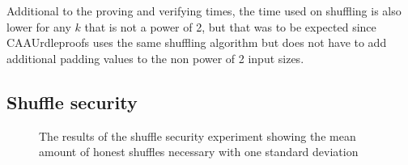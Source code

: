 Additional to the proving and verifying times, the time used on shuffling is also lower for any $k$ that is not a power of 2, but that was to be expected since CAAUrdleproofs uses the same shuffling algorithm but does not have to add additional padding values to the non power of 2 input sizes.


\subsection{Shuffle security}\label{subsec:Shuffle-security}

\begin{figure}[!htb]
    \centering
    \qquad
    \caption{The results of the shuffle security experiment showing the mean amount of honest shuffles necessary with one standard deviation}%
    \label{fig:shufflesecurity}%
\end{figure}

